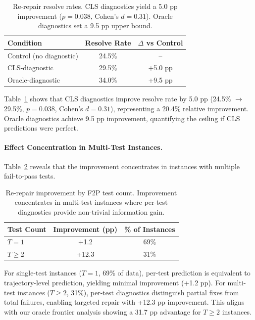 \documentclass[11pt,a4paper]{article}
\begin{document}
\begin{table}[t]
\centering
\small
\begin{tabular}{lcc}
\toprule
\textbf{Condition} & \textbf{Resolve Rate} & \textbf{$\Delta$ vs Control} \\
\midrule
Control (no diagnostic) & 24.5\% & -- \\
CLS-diagnostic & 29.5\% & +5.0 pp \\
Oracle-diagnostic & 34.0\% & +9.5 pp \\
\bottomrule
\end{tabular}
\caption{Re-repair resolve rates. CLS diagnostics yield a 5.0 pp improvement ($p{=}0.038$, Cohen's $d{=}0.31$). Oracle diagnostics set a 9.5 pp upper bound.}
\label{tab:rerepair}
\end{table}

Table~\ref{tab:rerepair} shows that CLS diagnostics improve resolve rate by 5.0 pp (24.5\% $\to$ 29.5\%, $p{=}0.038$, Cohen's $d{=}0.31$), representing a 20.4\% relative improvement.
Oracle diagnostics achieve 9.5 pp improvement, quantifying the ceiling if CLS predictions were perfect.

\paragraph{Effect Concentration in Multi-Test Instances.}
Table~\ref{tab:rerepair-breakdown} reveals that the improvement concentrates in instances with multiple fail-to-pass tests.

\begin{table}[t]
\centering
\small
\begin{tabular}{lcc}
\toprule
\textbf{Test Count} & \textbf{Improvement (pp)} & \textbf{\% of Instances} \\
\midrule
$T = 1$ & +1.2 & 69\% \\
$T \geq 2$ & +12.3 & 31\% \\
\bottomrule
\end{tabular}
\caption{Re-repair improvement by F2P test count. Improvement concentrates in multi-test instances where per-test diagnostics provide non-trivial information gain.}
\label{tab:rerepair-breakdown}
\end{table}

For single-test instances ($T{=}1$, 69\% of data), per-test prediction is equivalent to trajectory-level prediction, yielding minimal improvement (+1.2 pp).
For multi-test instances ($T{\geq}2$, 31\%), per-test diagnostics distinguish partial fixes from total failures, enabling targeted repair with +12.3 pp improvement.
This aligns with our oracle frontier analysis showing a 31.7 pp advantage for $T{\geq}2$ instances.
\end{document}
